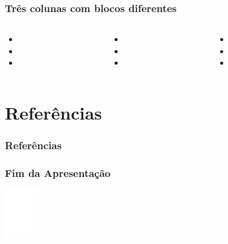 \documentclass[aspectratio=169]{beamer}
\begin{document}
\begin{frame}[fragile] \frametitle{Três colunas com blocos diferentes}
\begin{columns}[t]
\begin{column}{0.33\linewidth}
\begin{block}{\lipsum[4][2]}
\begin{itemize} \itemsep1em
 \item \lipsum[4][1]
 \item \lipsum[4][3]
 \item \lipsum[4][4]
\end{itemize}
\end{block}
\end{column}
\begin{column}{0.33\linewidth}
\begin{alertblock}{\lipsum[4][9]}
\begin{itemize} \itemsep1em
 \item \lipsum[4][10]
 \item \lipsum[4][11]
 \item \lipsum[4][12]
\end{itemize}
\end{alertblock}
\end{column}
\begin{column}{0.33\linewidth}
\begin{exampleblock}{\lipsum[4][5]}
\begin{itemize} \itemsep1em
 \item \lipsum[4][6]
 \item \lipsum[4][7]
 \item \lipsum[4][8]
\end{itemize}
\end{exampleblock}
\end{column}
\end{columns}
\end{frame}

\section{Referências}

\begin{frame}[fragile] \frametitle{Referências}
  \printbibliography
\end{frame}

\begin{frame} \frametitle{Fim da Apresentação}
\begin{center}
 \vspace{1em}

 \lipsum[3][20]

 \vspace{2em}
 \includegraphics[width=1.5cm]{logoif}
\end{center}
\end{frame}
\end{document}

